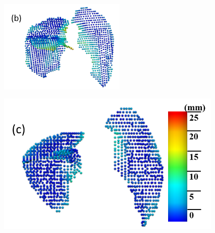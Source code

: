 \documentclass[]{spie}  %
\begin{document}
{\begin{figure}[htbp]
\begin{subfigure}
{\begin{minipage}[t]{0.21\linewidth}
  \includegraphics[width=\linewidth,trim={{.0\wd0} {.0\wd0} {.0\wd0} {.0\wd0}},clip]{Image/QuanlititativeResult2.png}
  \centerline{}
	\end{minipage}%
   }%
  \label{fig:QuanlititativeResult-b} 
\end{subfigure}
\begin{subfigure}{
  \begin{minipage}[t]{0.26\linewidth}
  \includegraphics[width=\linewidth,trim={{.0\wd0} {.0\wd0} {.0\wd0} {.0\wd0}},clip]{Image/QuanlititativeResult3.png}

\end{minipage}}
\end{subfigure}
\end{figure}}
\end{document}
